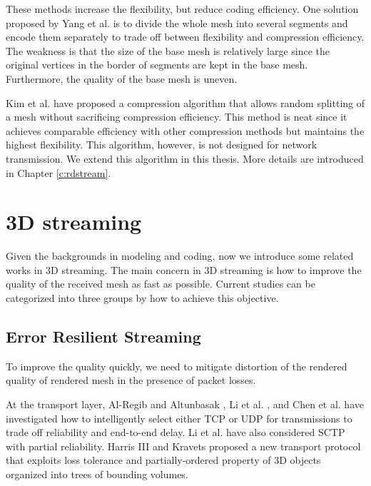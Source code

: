     These methods increase the flexibility, but reduce coding efficiency.
    One solution proposed by Yang et al. \cite{progressive:Yang}
    is to divide the whole mesh into several segments and encode them
    separately to trade off between flexibility and compression efficiency.
    The weakness is that the size of the base mesh is relatively large
    since the original vertices in the border of segments are kept in the base
    mesh. Furthermore, the quality of the base mesh is uneven.

    Kim et al. \cite{multiresolution:kim}
    have proposed a compression algorithm that allows random splitting of a mesh without
    sacrificing compression efficiency. This method is neat since it achieves comparable
    efficiency with other compression methods but maintains the highest flexibility.
    This algorithm, however, is not designed for 
	network transmission.  We extend this algorithm in this thesis. More details are introduced
    in Chapter \ref{c:rdstream}.  
    
    \section{3D streaming}
    \label{s:related:streaming}
    Given the backgrounds in modeling and coding, now we introduce some
    related works in 3D streaming. 
    The main concern in 3D streaming is how to improve the quality of the received
    mesh as fast as possible. Current studies can be categorized into three groups
    by how to achieve this objective.
    
    \subsection{Error Resilient Streaming}
    To improve the quality quickly, we need to mitigate distortion of the 
    rendered quality of rendered mesh in the presence of packet losses.

    At the transport layer, Al-Regib and Altunbasak \cite{3tpregib}, Li
    et al. \cite{Li2006}, and Chen et al. \cite{chen05hybrid} have
    investigated how to intelligently select either TCP or UDP for
    transmissions to trade off reliability and end-to-end delay.  Li et
    al. have also considered SCTP with partial reliability.
    Harris III and Kravets \cite{harris:design} proposed a new
    transport protocol that exploits loss tolerance and
    partially-ordered property of 3D objects organized into trees of
    bounding volumes.

